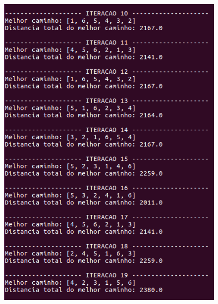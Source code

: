 \documentclass[hidelinks,12pt]{article}
\begin{document}
		\begin{figure}[!h]
			\centering
			\includegraphics[scale=0.6]{Figures/m6-2-2.png}
		\end{figure}

		\newpage
\end{document}
